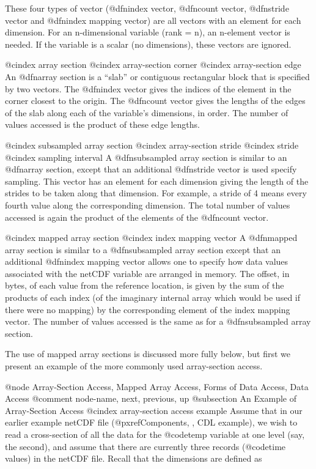 These four types of vector (@dfn{index vector},
@dfn{count vector}, @dfn{stride vector} and @dfn{index mapping vector})
are all vectors with an element for each dimension.
For an n-dimensional variable (rank = n), an n-element vector is needed.
If the variable is a scalar (no dimensions), these vectors are ignored.

@cindex array section
@cindex array-section corner
@cindex array-section edge
An @dfn{array section} is a ``slab'' or contiguous rectangular block
that is specified by two vectors.  The @dfn{index vector}
gives the indices of the element in the corner closest to the origin.
The @dfn{count vector} gives the lengths of the edges of the slab along
each of the variable's dimensions, in order.  The number of values
accessed is the product of these edge lengths.

@cindex subsampled array section
@cindex array-section stride
@cindex stride
@cindex sampling interval
A @dfn{subsampled array section} is similar to an @dfn{array section},
except that an additional @dfn{stride vector} is used specify sampling.
This vector has an element for each dimension giving the length of the
strides to be taken along that dimension.
For example, a stride of 4 means every fourth value along the
corresponding dimension.
The total number of values accessed is
again the product of the elements of the @dfn{count vector}.

@cindex mapped array section
@cindex index mapping vector
A @dfn{mapped array section} is similar to a @dfn{subsampled array section}
except that an additional @dfn{index mapping vector}
allows one to specify how data values associated
with the netCDF variable are arranged in memory.  The offset, in bytes,
of each value from the reference location, is given by the sum of the
products of each index (of the imaginary internal array which would be
used if there were no mapping) by the corresponding element of the index
mapping vector.  The number of values accessed is the same as for a
@dfn{subsampled array section}.

The use of mapped array sections is discussed more fully below, but
first we present an example of the more commonly used array-section access.

@node Array-Section Access, Mapped Array Access, Forms of Data Access, Data Access
@comment  node-name,  next,  previous,  up
@subsection An Example of Array-Section Access
@cindex array-section access example
Assume that in our earlier example
netCDF file (@pxref{Components, , CDL example}), we wish to read a
cross-section of all the
data for the @code{temp} variable at one level (say, the second), and
assume that there are currently three records (@code{time} values) in
the netCDF file.  Recall that the dimensions are defined as

